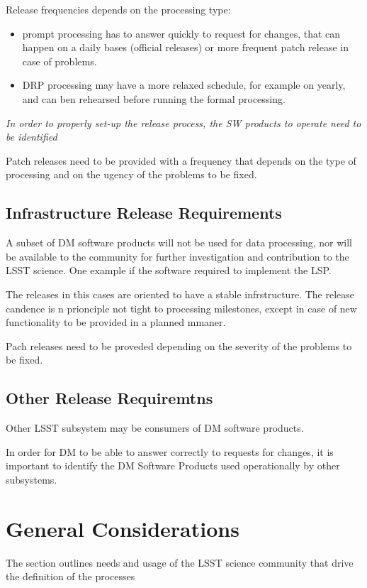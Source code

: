Release frequencies depends on the processing type:

\begin{itemize}
\item prompt processing has to answer quickly to request for changes, that can happen on a daily bases (official releases)
 or more frequent patch release in case of problems.
\item DRP processing may have a more relaxed schedule, for example on yearly, and can ben rehearsed before running the formal processing.
\end{itemize}

\textit{In order to properly set-up the release process, the SW products to operate need to be identified}

Patch releases need to be provided with a frequency that depends on the type of processing
and on the ugency of the problems to be fixed.


\subsection{Infrastructure Release Requirements} \label{sec:infreqs}

A subset of DM software products will not be used for data processing,
nor will be available to the community for further investigation and contribution to the LSST science.
One example if the software required to implement the LSP.

The releases in this cases are oriented to have a stable infrstructure.
The release candence is n prionciple not tight to processing milestones,
except in case of new functionality to be provided in a planned mmaner.

Pach releases need to be proveded depending on the severity of the problems to be fixed.


\subsection{Other Release Requiremtns} \label{other:reqs}

Other LSST subsystem may be consumers of DM software products.

In order for DM to be able to answer correctly to requests for changes, 
it is important to identify the DM Software Products used operationally by other subsystems.

\newpage
\section{General Considerations} \label{sec:considerations}

The section outlines needs and usage of the LSST science community that drive the definition of the processes 
